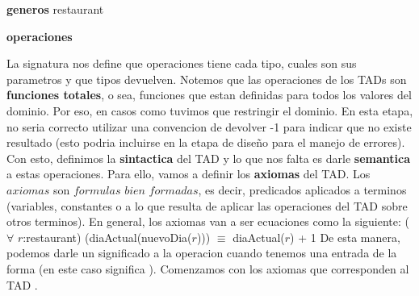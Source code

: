 \documentclass[10pt,a4paper]{article}
\begin{document}
\begin{tad}{}
	\medskip	
	\textbf{generos} restaurant
	\newline
	
	\textbf{operaciones}
	\medskip
	\medskip
	\medskip
	\medskip
	\medskip
	\medskip
	\medskip
	\medskip
	\medskip
	\medskip
\end{tad}
\medskip
\medskip
La signatura nos define que operaciones tiene cada tipo, cuales son sus parametros y que tipos devuelven. Notemos que las operaciones de los TADs son \textbf{funciones totales}, o sea, funciones que estan definidas para todos los valores del dominio. Por eso, en casos como  tuvimos que restringir el dominio. En esta etapa, no seria correcto utilizar una convencion de devolver -1 para indicar que no existe resultado (esto podria incluirse en la etapa de diseño para el manejo de errores).
\newline
\newline
Con esto, definimos la \textbf{sintactica} del TAD y lo que nos falta es darle \textbf{semantica} a estas operaciones. Para ello, vamos a definir los \textbf{axiomas} del TAD. Los $axiomas$ son $formulas$ $bien$ $formadas$, es decir, predicados aplicados a terminos (variables, constantes o a lo que resulta de aplicar las operaciones del TAD sobre otros terminos). En general, los axiomas van a ser ecuaciones como la siguiente:
\newline
\newline
($\forall$ $r$:restaurant) (diaActual(nuevoDia($r$))) $\equiv$ diaActual($r$) + 1
\newline
\newline
De esta manera, podemos darle un significado a la operacion  cuando tenemos una entrada de la forma  (en este caso significa ). 
\newpage
Comenzamos con los axiomas que corresponden al TAD .    
\newline
\end{document}
